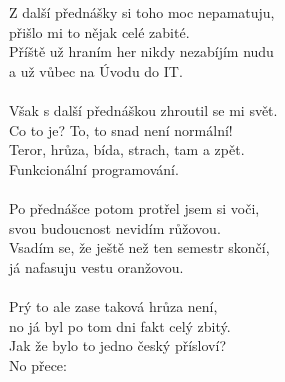 \newpage
Z další přednášky si toho moc nepamatuju,\\
přišlo mi to nějak celé zabité.\\
Příště už hraním her nikdy nezabíjím nudu\\
a už vůbec na Úvodu do IT.
\chorus\\
\\
Však s další přednáškou zhroutil se mi svět.\\
Co to je? To, to snad není normální!\\
Teror, hrůza, bída, strach, tam a zpět.\\
Funkcionální programování.
\chorus\\
\\
Po přednášce potom protřel jsem si voči,\\
svou budoucnost nevidím růžovou.\\
Vsadím se, že ještě než ten semestr skončí,\\
já nafasuju vestu oranžovou.\\
\\
Prý to ale zase taková hrůza není,\\
no já byl po tom dni fakt celý zbitý.\\
Jak že bylo to jedno český přísloví?\\
No přece: \\
\\

\newpage
